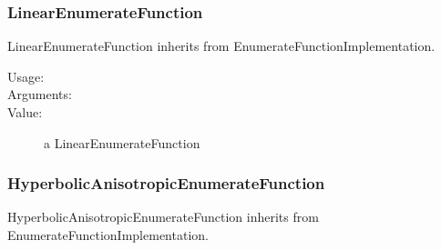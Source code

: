 \newpage
\subsubsection{LinearEnumerateFunction}

LinearEnumerateFunction inherits from EnumerateFunctionImplementation.

\begin{description}
\item[Usage:] \strut
{}

\item[Arguments:]  \strut
{}

\item[Value:] a LinearEnumerateFunction

\end{description}

\newpage
\subsubsection{HyperbolicAnisotropicEnumerateFunction}

HyperbolicAnisotropicEnumerateFunction inherits from EnumerateFunctionImplementation.

